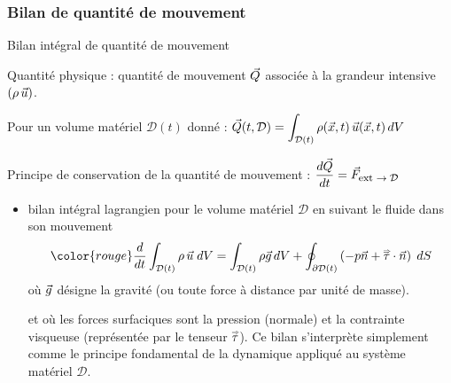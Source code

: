 \subsubsection{Bilan de quantité de mouvement}

\begin{frame}{Bilan intégral de quantité de mouvement }

\small

Quantité physique : quantité de mouvement $\vec{Q}$ associée à la grandeur intensive 
$(\rho \, \vec{u})$.

\medskip

Pour un volume matériel $\mathcal{D}(t)$ donné : 
$ \displaystyle
	\vec{Q}(t, \mathcal{D}) 
	= \int_{\mathcal{D}(t)} \rho(\vec{x}, t)\, \vec{u}(\vec{x}, t) \, dV
$

\pause

Principe de conservation de la quantité de mouvement : 
$\displaystyle \frac{d \vec{Q}}{dt} = \vec{F}_{\mbox{\footnotesize ext $\rightarrow \mathcal{D}$}}$

\smallskip

\begin{itemize}
\item
	bilan intégral lagrangien pour le volume matériel $\mathcal{D}$ en suivant le fluide
	dans son mouvement
	\begin{equation}
		\color{rouge}
		\ddt{} \int_{\mathcal{D}(t)} \rho \, \myvec{u} \; dV 
		=
		\int_{\mathcal{D}(t)} \rho \myvec{g} \, dV 
		+ \oint_{\partial \mathcal{D}(t)} 
		\left( -p \myvec{n} + \mytensor{\tau} \cdot \myvec{n}\right) \; dS
		\label{eq:bilan_global_lagrangien_qdm}
	\end{equation}
	où $\vec{g}$ désigne la gravité (ou toute force à distance par unité de masse).
	
	et où les forces surfaciques sont la pression (normale) et la contrainte visqueuse (représentée par le tenseur $\accentset{\Rightarrow}{\tau}$).
	Ce bilan s'interprète simplement comme le \textcolor{vert}{principe fondamental de la dynamique} 
	appliqué au système matériel $\mathcal{D}$.


\end{itemize}
\end{frame}
